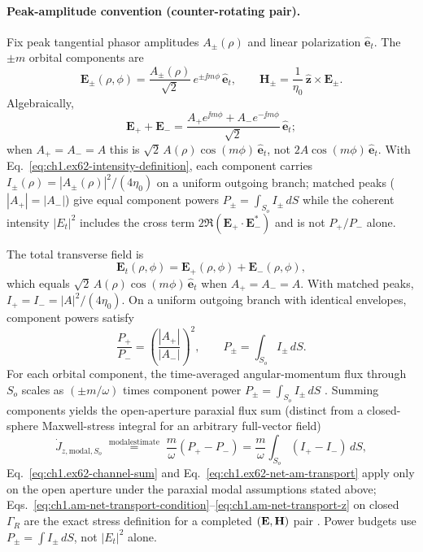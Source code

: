 \paragraph{Peak-amplitude convention (counter-rotating pair).}
Fix peak tangential phasor amplitudes $A_\pm(\rho)$ and linear polarization $\hat{\mathbf{e}}_t$. The $\pm m$ orbital components are
\begin{equation}
\label{eq:ch1.ex62-counter-rotating-components}
\mathbf{E}_\pm(\rho,\phi)=\frac{A_\pm(\rho)}{\sqrt{2}}\,e^{\pm\jj m\phi}\,\hat{\mathbf{e}}_t,
\qquad
\mathbf{H}_\pm=\frac{1}{\eta_0}\,\hat{\mathbf{z}}\times\mathbf{E}_\pm.
\end{equation}
Algebraically,
\begin{equation}
\label{eq:ch1.ex62-counter-rotating-sum-derive}
\mathbf{E}_++\mathbf{E}_-
=\frac{A_+ e^{\jj m\phi}+A_- e^{-\jj m\phi}}{\sqrt{2}}\,\hat{\mathbf{e}}_t;
\end{equation}
when $A_+=A_-=A$ this is $\sqrt{2}\,A(\rho)\cos(m\phi)\,\hat{\mathbf{e}}_t$, not $2A\cos(m\phi)\,\hat{\mathbf{e}}_t$.
With Eq.~\eqref{eq:ch1.ex62-intensity-definition}, each component carries
$I_\pm(\rho)=|A_\pm(\rho)|^2/(4\eta_0)$ on a uniform outgoing branch; matched peaks ($|A_+|=|A_-|$) give equal component powers $P_\pm=\int_{S_o}I_\pm\,dS$ while the coherent intensity $|E_t|^2$ includes the cross term $2\Re(\mathbf{E}_+\cdot\mathbf{E}_-^*)$ and is not $P_+/P_-$ alone.

The total transverse field is
\begin{equation}
\label{eq:ch1.ex62-counter-rotating-superposition}
\mathbf{E}_t(\rho,\phi)
=
\mathbf{E}_+(\rho,\phi)+\mathbf{E}_-(\rho,\phi),
\end{equation}
which equals $\sqrt{2}\,A(\rho)\cos(m\phi)\,\hat{\mathbf{e}}_t$ when $A_+=A_-=A$.
With matched peaks, $I_+=I_-=|A|^2/(4\eta_0)$. On a uniform outgoing branch with identical envelopes, component powers satisfy
\begin{equation}
\label{eq:ch1.ex62-power-amplitude-ratio}
\frac{P_+}{P_-}=\left(\frac{|A_+|}{|A_-|}\right)^2,
\qquad
P_\pm=\int_{S_o} I_\pm\,dS.
\end{equation}
For each orbital component, the time-averaged angular-momentum flux through \(S_o\)
scales as \((\pm m/\omega)\) times component power
\(P_\pm = \int_{S_o} I_\pm\,dS\) \cite{stratton1941}. Summing components yields the open-aperture paraxial flux sum (distinct from a closed-sphere Maxwell-stress integral for an arbitrary full-vector field)
\begin{equation}
\label{eq:ch1.ex62-channel-sum}
\dot J_{z,\mathrm{modal},S_o}
\;\stackrel{\mathrm{modal estimate}}{=}\;
\frac{m}{\omega}(P_+ - P_-)
=
\frac{m}{\omega}\int_{S_o}(I_+-I_-)\,dS,
\end{equation}
Eq.~\eqref{eq:ch1.ex62-channel-sum} and Eq.~\eqref{eq:ch1.ex62-net-am-transport} apply only on the open aperture under the paraxial modal assumptions stated above; Eqs.~\eqref{eq:ch1.am-net-transport-condition}--\eqref{eq:ch1.am-net-transport-z} on closed $\Gamma_R$ are the exact stress definition for a completed $(\mathbf{E},\mathbf{H})$ pair \cite{stratton1941,harrington2001,allen1992}. Power budgets use $P_\pm=\int I_\pm\,dS$, not $|E_t|^2$ alone.

